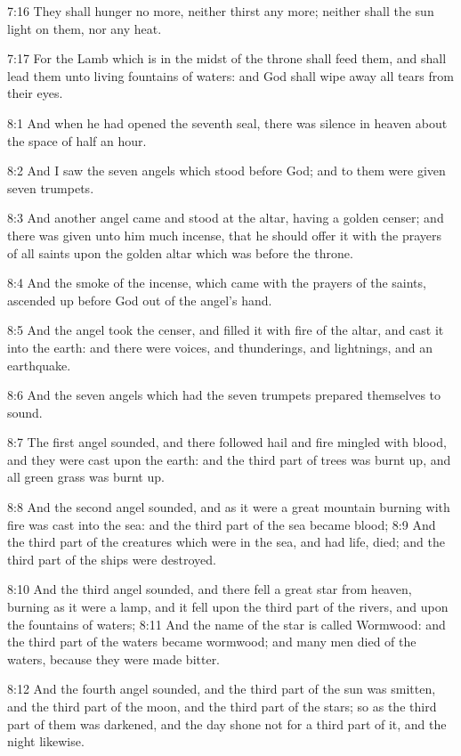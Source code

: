 7:16 They shall hunger no more, neither thirst any more; neither shall the sun light on them, nor any heat.

7:17 For the Lamb which is in the midst of the throne shall feed them, and shall lead them unto living fountains of waters: and God shall wipe away all tears from their eyes.

8:1 And when he had opened the seventh seal, there was silence in heaven about the space of half an hour.

8:2 And I saw the seven angels which stood before God; and to them were given seven trumpets.

8:3 And another angel came and stood at the altar, having a golden censer; and there was given unto him much incense, that he should offer it with the prayers of all saints upon the golden altar which was before the throne.

8:4 And the smoke of the incense, which came with the prayers of the saints, ascended up before God out of the angel's hand.

8:5 And the angel took the censer, and filled it with fire of the altar, and cast it into the earth: and there were voices, and thunderings, and lightnings, and an earthquake.

8:6 And the seven angels which had the seven trumpets prepared themselves to sound.

8:7 The first angel sounded, and there followed hail and fire mingled with blood, and they were cast upon the earth: and the third part of trees was burnt up, and all green grass was burnt up.

8:8 And the second angel sounded, and as it were a great mountain burning with fire was cast into the sea: and the third part of the sea became blood; 8:9 And the third part of the creatures which were in the sea, and had life, died; and the third part of the ships were destroyed.

8:10 And the third angel sounded, and there fell a great star from heaven, burning as it were a lamp, and it fell upon the third part of the rivers, and upon the fountains of waters; 8:11 And the name of the star is called Wormwood: and the third part of the waters became wormwood; and many men died of the waters, because they were made bitter.

8:12 And the fourth angel sounded, and the third part of the sun was smitten, and the third part of the moon, and the third part of the stars; so as the third part of them was darkened, and the day shone not for a third part of it, and the night likewise.

